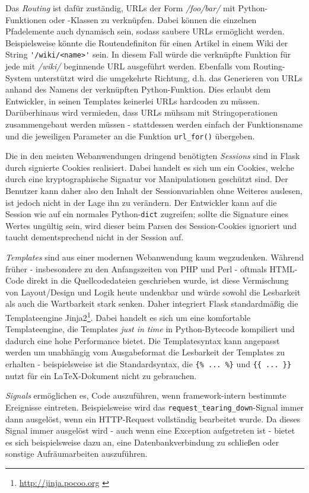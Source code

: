 Das \emph{Routing} ist dafür zuständig, URLs der Form \emph{/foo/bar/} mit Python-Funktionen oder
-Klassen zu verknüpfen. Dabei können die einzelnen Pfadelemente auch dynamisch sein, sodass saubere
URLs ermöglicht werden. Beispielsweise könnte die Routendefiniton für einen Artikel in einem
Wiki der String \lstinline{'/wiki/<name>'} sein. In diesem Fall würde die verknüpfte Funktion für
jede mit \emph{/wiki/} beginnende URL ausgeführt werden. Ebenfalls vom Routing-System unterstützt
wird die umgekehrte Richtung, d.h. das Generieren von URLs anhand des Namens der verknüpften
Python-Funktion. Dies erlaubt dem Entwickler, in seinen Templates keinerlei URLs hardcoden zu
müssen. Darüberhinaus wird vermieden, dass URLs mühsam mit Stringoperationen zusammengebaut werden
müssen - stattdessen werden einfach der Funktionsname und die jeweiligen Parameter an die Funktion
\lstinline{url_for()} übergeben.

Die in den meisten Webanwendungen dringend benötigten \emph{Sessions} sind in Flask durch signierte
Cookies realisiert. Dabei handelt es sich um ein Cookies, welche durch eine kryptographische
Signatur vor Manipulationen geschützt sind. Der Benutzer kann daher also den Inhalt der
Sessionvariablen ohne Weiteres auslesen, ist jedoch nicht in der Lage ihn zu verändern. Der
Entwickler kann auf die Session wie auf ein normales Python-\lstinline{dict} zugreifen; sollte die
Signature eines Wertes ungültig sein, wird dieser beim Parsen des Session-Cookies ignoriert und
taucht dementsprechend nicht in der Session auf.

\emph{Templates} sind aus einer modernen Webanwendung kaum wegzudenken. Während früher -
insbesondere zu den Anfangszeiten von PHP und Perl - oftmals HTML-Code direkt in die
Quellcodedateien geschrieben wurde, ist diese Vermischung von Layout/Design und Logik heute
undenkbar und würde sowohl die Lesbarkeit als auch die Wartbarkeit stark senken. Daher integriert
Flask standardmäßig die Templateengine
Jinja2\footnote{\href{http://jinja.pocoo.org}{http://jinja.pocoo.org} \citep{jinja}}. Dabei handelt es sich um
eine komfortable Templateengine, die Templates \emph{just in time} in Python-Bytecode kompiliert und
dadurch eine hohe Performance bietet. Die Templatesyntax kann angepasst werden um unabhängig vom
Ausgabeformat die Lesbarkeit der Templates zu erhalten - beispielsweise ist die Standardsyntax, die
\lstinline|{% ... %}| und \lstinline|{{ ... }}| nutzt für ein \LaTeX-Dokument nicht zu
gebrauchen.

\emph{Signals} ermöglichen es, Code auszuführen, wenn framework-intern bestimmte Ereignisse
eintreten. Beispielsweise wird das \lstinline{request_tearing_down}-Signal immer dann ausgelöst,
wenn ein HTTP-Request vollständig bearbeitet wurde. Da dieses Signal immer ausgelöst wird - auch wenn
eine Exception aufgetreten ist - bietet es sich beispielsweise dazu an, eine Datenbankverbindung zu
schließen oder sonstige Aufräumarbeiten auszuführen.

